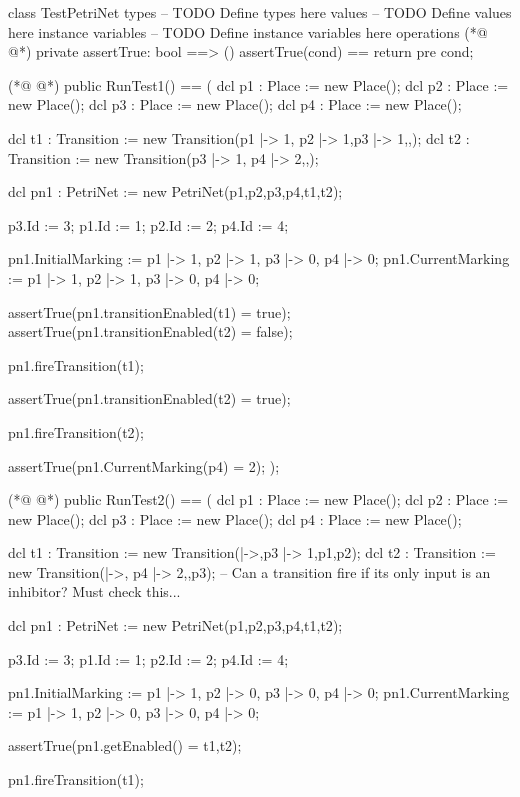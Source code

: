 \begin{vdmpp}
class TestPetriNet
types
-- TODO Define types here
values
-- TODO Define values here
instance variables
-- TODO Define instance variables here
operations
(*@
\label{assertTrue:9}
@*)
 private assertTrue: bool ==> ()
  assertTrue(cond) == return
 pre cond;

(*@
\label{RunTest1:13}
@*)
 public RunTest1() == (
  dcl p1 : Place := new Place();
  dcl p2 : Place := new Place();
  dcl p3 : Place := new Place();
  dcl p4 : Place := new Place();
  
  dcl t1 : Transition := new Transition({p1 |-> 1, p2 |-> 1},{p3 |-> 1},{},{});
  dcl t2 : Transition := new Transition({p3 |-> 1}, {p4 |-> 2},{},{});
  
  dcl pn1 : PetriNet := new PetriNet({p1,p2,p3,p4},{t1,t2});
  
  p3.Id := 3;
  p1.Id := 1;
  p2.Id := 2;
  p4.Id := 4;
  
  pn1.InitialMarking := {p1 |-> 1, p2 |-> 1, p3 |-> 0, p4 |-> 0};
  pn1.CurrentMarking := {p1 |-> 1, p2 |-> 1, p3 |-> 0, p4 |-> 0};
  
  assertTrue(pn1.transitionEnabled(t1) = true);
  assertTrue(pn1.transitionEnabled(t2) = false);
  
  pn1.fireTransition(t1);
  
  assertTrue(pn1.transitionEnabled(t2) = true);
  
  pn1.fireTransition(t2);
  
  assertTrue(pn1.CurrentMarking(p4) = 2);
 );
 
(*@
\label{RunTest2:44}
@*)
 public RunTest2() == (
  dcl p1 : Place := new Place();
  dcl p2 : Place := new Place();
  dcl p3 : Place := new Place();
  dcl p4 : Place := new Place();
  
  dcl t1 : Transition := new Transition({|->},{p3 |-> 1},{p1},{p2});
  dcl t2 : Transition := new Transition({|->}, {p4 |-> 2},{},{p3}); -- Can a transition fire if its only input is an inhibitor? Must check this...
  
  dcl pn1 : PetriNet := new PetriNet({p1,p2,p3,p4},{t1,t2});
  
  p3.Id := 3;
  p1.Id := 1;
  p2.Id := 2;
  p4.Id := 4;
  
  pn1.InitialMarking := {p1 |-> 1, p2 |-> 0, p3 |-> 0, p4 |-> 0};
  pn1.CurrentMarking := {p1 |-> 1, p2 |-> 0, p3 |-> 0, p4 |-> 0};
  
  assertTrue(pn1.getEnabled() = {t1,t2});
  
  pn1.fireTransition(t1);
  

\end{vdmpp}
